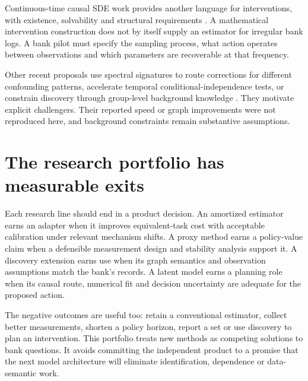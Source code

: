 Continuous-time causal SDE work provides another language for interventions,
with existence, solvability and structural requirements
\citep{sde2026}. A mathematical intervention construction does not by
itself supply an estimator for irregular bank logs. A bank pilot must
specify the sampling process, what action operates between observations
and which parameters are recoverable at that frequency.

Other recent proposals use spectral signatures to route corrections for
different confounding patterns, accelerate temporal conditional-independence
tests, or constrain discovery through group-level background knowledge
\citep{lucid2026,causalts2026,vargas2026}. They motivate explicit
challengers. Their reported speed or graph improvements were not reproduced
here, and background constraints remain substantive assumptions.

\section{The research portfolio has measurable exits}
Each research line should end in a product decision. An amortized estimator
earns an adapter when it improves equivalent-task cost with acceptable
calibration under relevant mechanism shifts. A proxy method earns a
policy-value claim when a defensible measurement design and stability
analysis support it. A discovery extension earns use when its graph
semantics and observation assumptions match the bank's records. A latent
model earns a planning role when its causal route, numerical fit and
decision uncertainty are adequate for the proposed action.

The negative outcomes are useful too: retain a conventional estimator,
collect better measurements, shorten a policy horizon, report a set or
use discovery to plan an intervention. This portfolio treats new methods
as competing solutions to bank questions. It avoids committing the
independent product to a promise that the next model architecture will
eliminate identification, dependence or data-semantic work.
